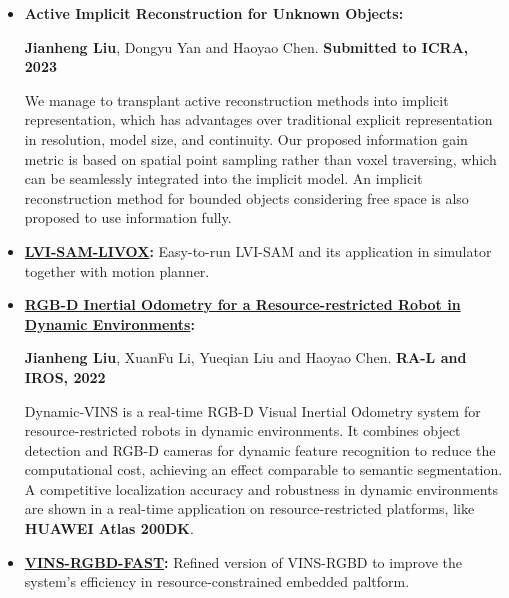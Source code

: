 \documentclass[11pt,a4paper,sans]{moderncv}        %
\begin{document}
\begin{itemize}

    \item \textbf{Active Implicit Reconstruction for Unknown Objects:} 

\textbf{Jianheng Liu}, Dongyu Yan and Haoyao Chen. \textbf{Submitted to ICRA, 2023}

We manage to transplant active reconstruction methods into
implicit representation, which has advantages over
traditional explicit representation in resolution, model
size, and continuity.
Our proposed information gain metric is based on spatial
point sampling rather than voxel traversing, which can be
seamlessly integrated into the implicit model.
An implicit reconstruction method for bounded objects
considering free space is also proposed to use information
fully.

\item \textbf{\href{https://github.com/jianhengLiu/LVI-SAM-LIVOX}{LVI-SAM-LIVOX}:} Easy-to-run LVI-SAM and its application in simulator together with motion planner.

\item \textbf{\href{https://github.com/HITSZ-NRSL/Dynamic-VINS.git}{RGB-D Inertial Odometry for a Resource-restricted Robot in Dynamic Environments}:} 

\textbf{Jianheng Liu}, XuanFu Li, Yueqian Liu and Haoyao Chen. \textbf{RA-L and IROS, 2022}

Dynamic-VINS is a real-time RGB-D Visual Inertial Odometry system for resource-restricted robots in dynamic environments. It combines object detection and RGB-D cameras for dynamic feature recognition to reduce the computational cost, achieving an effect comparable to semantic segmentation. A competitive localization accuracy and robustness in dynamic environments are shown in a real-time application on resource-restricted platforms, like \textbf{HUAWEI Atlas 200DK}.


\item \textbf{\href{https://github.com/jianhengLiu/VINS-RGBD-FAST}{VINS-RGBD-FAST}:} Refined version of VINS-RGBD to improve the system's efficiency in resource-constrained embedded paltform.


\end{itemize}
\end{document}
